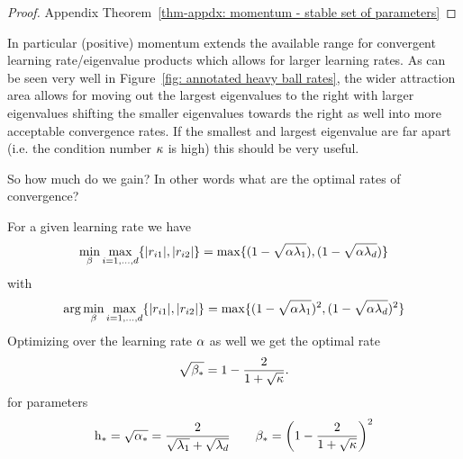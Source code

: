 \begin{proof}
	Appendix Theorem~\ref{thm-appdx: momentum - stable set of parameters}
\end{proof}

In particular (positive) momentum extends the available range for convergent
learning rate/eigenvalue products which allows for larger learning rates. As
can be seen very well in Figure~\ref{fig: annotated heavy ball rates}, the
wider attraction area allows for moving out the largest eigenvalues to the
right with larger eigenvalues shifting the smaller eigenvalues towards the
right as well into more acceptable convergence rates. If the smallest and
largest eigenvalue are far apart (i.e. the condition number \(\kappa\) is
high) this should be very useful.

So how much do we gain? In other words what are the optimal rates of
convergence? 

\begin{lemma}
	\label{lem: optimal hb parameter selection}
	For a given learning rate we have
	\begin{align*}
		\min_{\beta}\max_{i=1,\dots, d}\{|r_{i1}|,|r_{i2}|\}
		= \max\{(1-\sqrt{\alpha\lambda_1}), (1-\sqrt{\alpha\lambda_d})\}
	\end{align*}
	with 
	\begin{align*}
		\arg\min_{\beta}\max_{i=1,\dots,d}\{|r_{i1}|,|r_{i2}|\}
		= \max\{(1-\sqrt{\alpha\lambda_1})^2, (1-\sqrt{\alpha\lambda_d})^2\}
	\end{align*}
	Optimizing over the learning rate \(\alpha\) as well we get the optimal rate
	\begin{align*}
		\sqrt{\beta_*} = 1-\frac{2}{1+\sqrt{\kappa}}.
	\end{align*}
	for parameters
	\begin{align*}
		\text{h}_* = \sqrt{\alpha_*} = \frac{2}{\sqrt{\lambda_1}+\sqrt{\lambda_d}}
		\qquad
		\beta_*=\left(1-\frac{2}{1+\sqrt{\kappa}}\right)^2
	\end{align*}
\end{lemma}

